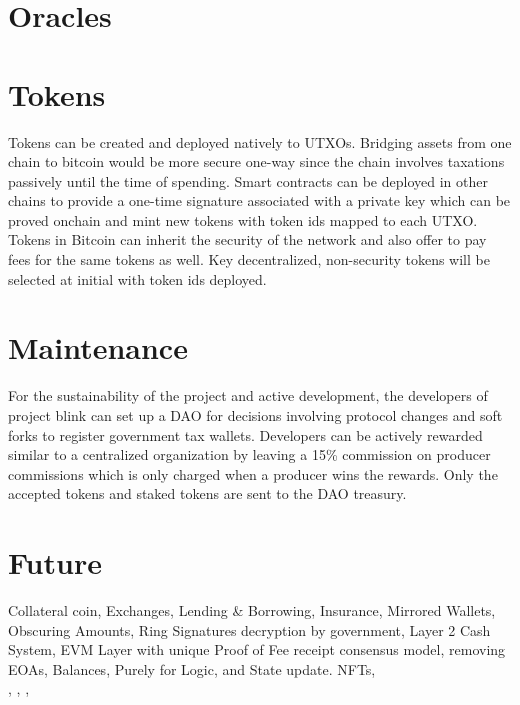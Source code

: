 \documentclass[a4paper,10pt]{article}
\begin{document}
\section{Oracles}

\section{Tokens}
Tokens can be created and deployed natively to UTXOs. Bridging assets from one chain to bitcoin would be more secure one-way since the chain involves taxations passively until the time of spending. Smart contracts can be deployed in other chains to provide a one-time signature associated with a private key which can be proved onchain and mint new tokens with token ids mapped to each UTXO. Tokens in Bitcoin can inherit the security of the network and also offer to pay fees for the same tokens as well. Key decentralized, non-security tokens will be selected at initial with token ids deployed. 
 
\section{Maintenance}
For the sustainability of the project and active development, the developers of project blink can set up a DAO for decisions involving protocol changes and soft forks to register government tax wallets. Developers can be actively rewarded similar to a centralized organization by leaving a 15\% commission on producer commissions which is only charged when a producer wins the rewards. Only the accepted tokens and staked tokens are sent to the DAO treasury.

\section{Future}

Collateral coin, Exchanges, Lending \& Borrowing, Insurance, Mirrored Wallets, Obscuring Amounts, Ring Signatures decryption by government, Layer 2 Cash System, EVM Layer with unique Proof of Fee receipt consensus model, removing EOAs, Balances, Purely for Logic, and State update. NFTs,\\

\cite{nakamoto2008bitcoin}, \cite{poon2016bitcoin} , \cite{yakovenko2018solana}, \cite{wood2014ethereum}




\end{document}
